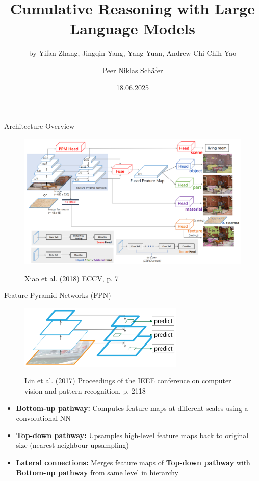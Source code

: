 \documentclass{beamer}
\title[]{Cumulative Reasoning with Large Language Models}
\subtitle{by Yifan Zhang, Jingqin Yang, Yang Yuan, Andrew Chi-Chih Yao}
\author{Peer Niklas Schäfer}
\institute{University of Cologne}
\date{18.06.2025}
\begin{document}
\begin{frame}
    \titlepage
\end{frame}


\begin{frame}{Architecture Overview}
    \begin{figure}
        \centering
        \includegraphics[width=\textwidth]{Images/UPerNetArchitectureOverview.png}

        \vspace{0.5em}
        {\tiny Xiao et al. (2018) ECCV, p. 7}
    \end{figure}
\end{frame}


\begin{frame}{Feature Pyramid Networks (FPN)}
    \begin{figure}
        \centering
        \includegraphics[width=0.7\textwidth]{Images/FPNOverview.png}

        \vspace{0.5em}
        {\tiny Lin et al. (2017) Proceedings of the IEEE conference on computer vision and pattern recognition, p. 2118}
    \end{figure}
    \begin{itemize}
        \item \textbf{Bottom-up pathway:} Computes feature maps at different scales using a convolutional NN
        \item \textbf{Top-down pathway:} Upsamples high-level feature maps back to original size (nearest neighbour upsampling)
        \item \textbf{Lateral connections:} Merges feature maps of \textbf{Top-down pathway} with \textbf{Bottom-up pathway} from same level in hierarchy
    \end{itemize}
\end{frame}
\end{document}
